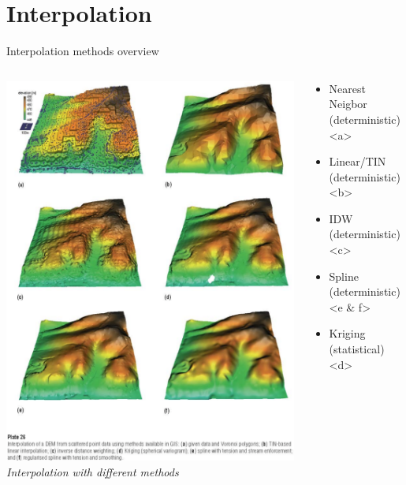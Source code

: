 
\section{Interpolation}
\begin{frame}{Interpolation methods overview}
	\begin{columns}[c] %
		\begin{column}{.5\textwidth}
			\centering
			\includegraphics[trim=0 100 0 0,clip,height=.75\textheight]{../writeup/images/dem.png}\\
			\textit{\footnotesize Interpolation with different methods \cite{mitas_spatial_1999}}
		\end{column}%
		\hfill%
		\begin{column}{.5\textwidth}
			\begin{itemize}
				\item Nearest Neigbor (deterministic) <a>
				\item Linear/TIN (deterministic) <b>
				\item IDW (deterministic) <c>
				\item Spline (deterministic) <e \& f>
				\item Kriging (statistical) <d>
			\end{itemize}
		\end{column}%
	\end{columns}\end{frame}
